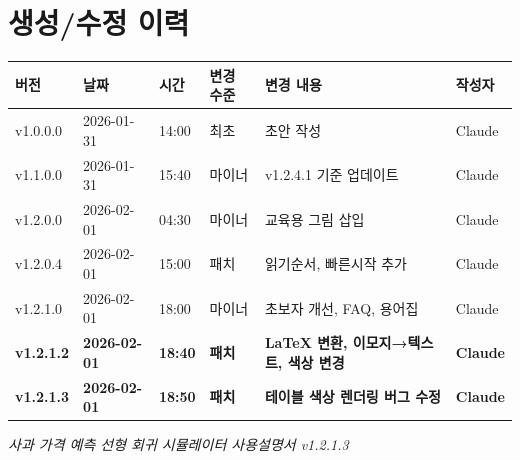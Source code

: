 \documentclass[11pt,a4paper]{article}
\begin{document}
\section*{생성/수정 이력}

\begin{center}
\begin{tabular}{llllll}
\toprule
\textbf{버전} & \textbf{날짜} & \textbf{시간} & \textbf{변경 수준} & \textbf{변경 내용} & \textbf{작성자} \\
\midrule
v1.0.0.0 & 2026-01-31 & 14:00 & 최초 & 초안 작성 & Claude \\
v1.1.0.0 & 2026-01-31 & 15:40 & 마이너 & v1.2.4.1 기준 업데이트 & Claude \\
v1.2.0.0 & 2026-02-01 & 04:30 & 마이너 & 교육용 그림 삽입 & Claude \\
v1.2.0.4 & 2026-02-01 & 15:00 & 패치 & 읽기순서, 빠른시작 추가 & Claude \\
v1.2.1.0 & 2026-02-01 & 18:00 & 마이너 & 초보자 개선, FAQ, 용어집 & Claude \\
\textbf{v1.2.1.2} & \textbf{2026-02-01} & \textbf{18:40} & \textbf{패치} & \textbf{LaTeX 변환, 이모지→텍스트, 색상 변경} & \textbf{Claude} \\
\textbf{v1.2.1.3} & \textbf{2026-02-01} & \textbf{18:50} & \textbf{패치} & \textbf{테이블 색상 렌더링 버그 수정} & \textbf{Claude} \\
\bottomrule
\end{tabular}
\end{center}

\vfill
\begin{center}
\textit{사과 가격 예측 선형 회귀 시뮬레이터 사용설명서 v1.2.1.3}
\end{center}
\end{document}
